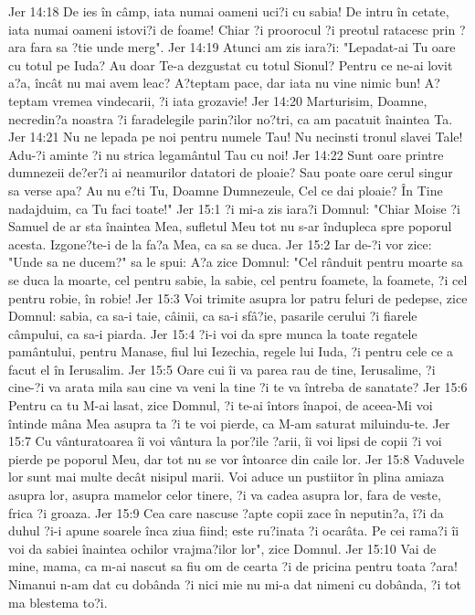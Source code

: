 Jer 14:18  De ies în câmp, iata numai oameni uci?i cu sabia! De intru în cetate, iata numai oameni istovi?i de foame! Chiar ?i proorocul ?i preotul ratacesc prin ?ara fara sa ?tie unde merg".
Jer 14:19  Atunci am zis iara?i: "Lepadat-ai Tu oare cu totul pe Iuda? Au doar Te-a dezgustat cu totul Sionul? Pentru ce ne-ai lovit a?a, încât nu mai avem leac? A?teptam pace, dar iata nu vine nimic bun! A?teptam vremea vindecarii, ?i iata grozavie!
Jer 14:20  Marturisim, Doamne, necredin?a noastra ?i faradelegile parin?ilor no?tri, ca am pacatuit înaintea Ta.
Jer 14:21  Nu ne lepada pe noi pentru numele Tau! Nu necinsti tronul slavei Tale! Adu-?i aminte ?i nu strica legamântul Tau cu noi!
Jer 14:22  Sunt oare printre dumnezeii de?er?i ai neamurilor datatori de ploaie? Sau poate oare cerul singur sa verse apa? Au nu e?ti Tu, Doamne Dumnezeule, Cel ce dai ploaie? În Tine nadajduim, ca Tu faci toate!"
Jer 15:1  ?i mi-a zis iara?i Domnul: "Chiar Moise ?i Samuel de ar sta înaintea Mea, sufletul Meu tot nu s-ar îndupleca spre poporul acesta. Izgone?te-i de la fa?a Mea, ca sa se duca.
Jer 15:2  Iar de-?i vor zice: "Unde sa ne ducem?" sa le spui: A?a zice Domnul: "Cel rânduit pentru moarte sa se duca la moarte, cel pentru sabie, la sabie, cel pentru foamete, la foamete, ?i cel pentru robie, în robie!
Jer 15:3  Voi trimite asupra lor patru feluri de pedepse, zice Domnul: sabia, ca sa-i taie, câinii, ca sa-i sfâ?ie, pasarile cerului ?i fiarele câmpului, ca sa-i piarda.
Jer 15:4  ?i-i voi da spre munca la toate regatele pamântului, pentru Manase, fiul lui Iezechia, regele lui Iuda, ?i pentru cele ce a facut el în Ierusalim.
Jer 15:5  Oare cui îi va parea rau de tine, Ierusalime, ?i cine-?i va arata mila sau cine va veni la tine ?i te va întreba de sanatate?
Jer 15:6  Pentru ca tu M-ai lasat, zice Domnul, ?i te-ai întors înapoi, de aceea-Mi voi întinde mâna Mea asupra ta ?i te voi pierde, ca M-am saturat miluindu-te.
Jer 15:7  Cu vânturatoarea îi voi vântura la por?ile ?arii, îi voi lipsi de copii ?i voi pierde pe poporul Meu, dar tot nu se vor întoarce din caile lor.
Jer 15:8  Vaduvele lor sunt mai multe decât nisipul marii. Voi aduce un pustiitor în plina amiaza asupra lor, asupra mamelor celor tinere, ?i va cadea asupra lor, fara de veste, frica ?i groaza.
Jer 15:9  Cea care nascuse ?apte copii zace în neputin?a, î?i da duhul ?i-i apune soarele înca ziua fiind; este ru?inata ?i ocarâta. Pe cei rama?i îi voi da sabiei înaintea ochilor vrajma?ilor lor", zice Domnul.
Jer 15:10  Vai de mine, mama, ca m-ai nascut sa fiu om de cearta ?i de pricina pentru toata ?ara! Nimanui n-am dat cu dobânda ?i nici mie nu mi-a dat nimeni cu dobânda, ?i tot ma blestema to?i.
